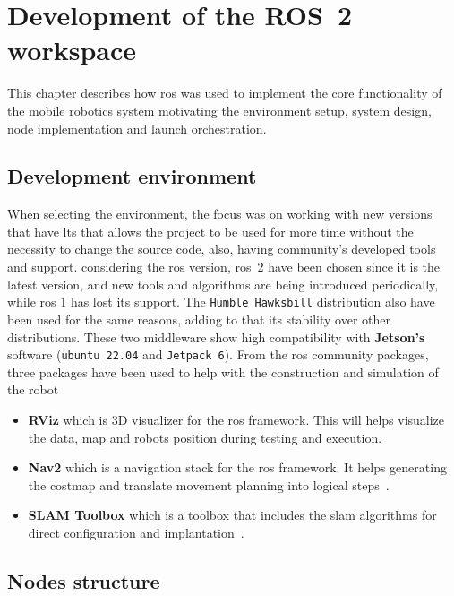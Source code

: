 \chapter{Development of the ROS~2 workspace}\label{chap:ros2}

This chapter describes how \gls{ros} was used to implement the core functionality of the mobile robotics system motivating the environment setup, system design, node implementation and launch orchestration.

\section{Development environment}

When selecting the environment, the focus was on working with new versions that have \gls{lts} that allows the project to be used for more time without the necessity to change the source code, also, having community's developed tools and support.
considering the \gls{ros} version, \gls{ros}~2 have been chosen since it is the latest version, and new tools and algorithms are being introduced periodically, while \gls{ros} 1 has lost its support. The \texttt{Humble Hawksbill} distribution also have been used for the same reasons, adding to that its stability over other distributions.
These two middleware show high compatibility with \textbf{Jetson's} software (\texttt{ubuntu 22.04} and \texttt{Jetpack 6}).
From the \gls{ros} community packages, three packages have been used to help with the construction and simulation of the robot
\begin{itemize}
  \item \textbf{RViz} which is 3D visualizer for the \gls{ros} framework. This will helps visualize the data, map and robots position during testing and execution.

  \item \textbf{Nav2} which is a navigation stack for the \gls{ros} framework. It helps generating the \gls{costmap} and translate movement planning into logical steps~\cite{nav2}.

  \item \textbf{SLAM Toolbox} which is a toolbox that includes the \gls{slam} algorithms for direct configuration and implantation~\cite{slamtool}.
\end{itemize}

\section{Nodes structure}

